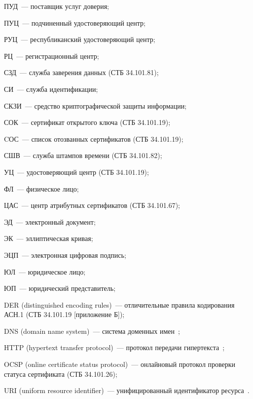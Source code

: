 ПУД~--- поставщик услуг доверия;

ПУЦ~--- подчиненный удостоверяющий центр;

РУЦ~--- республиканский удостоверяющий центр;

РЦ~--- регистрационный центр;

СЗД~--- служба заверения данных (СТБ 34.101.81);

СИ~--- служба идентификации;

СКЗИ~--- средство криптографической защиты информации;

СОК~--- сертификат открытого ключа (СТБ 34.101.19);

CОС~--- список отозванных сертификатов (СТБ 34.101.19);

СШВ~--- служба штампов времени (СТБ 34.101.82);

УЦ~--- удостоверяющий центр (СТБ 34.101.19);

ФЛ~--- физическое лицо;

ЦАС~--- центр атрибутных сертификатов (СТБ 34.101.67);

ЭД~--- электронный документ;

ЭК~--- эллиптическая кривая;

ЭЦП~--- электронная цифровая подпись;

ЮЛ~--- юридическое лицо;

ЮП~--- юридический представитель;

DER (distinguished encoding rules)~--- отличительные правила кодирования АСН.1
(СТБ 34.101.19 [приложение Б]);

DNS (domain name system)~--- система доменных имен~\cite{DNS};

HTTP (hypertext transfer protocol)~--- протокол передачи гипертекста~\cite{HTTP};

OCSP (online certificate status protocol)~--- онлайновый протокол проверки 
статуса сертификата (СТБ 34.101.26);

URI (uniform resource identifier)~--- унифицированный идентификатор ресурса~\cite{URI}.

